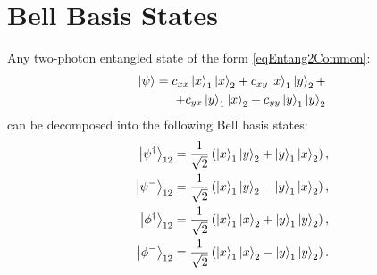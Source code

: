 \section{Bell Basis States}

Any two-photon entangled state of the form \eqref{eqEntang2Common}:
\begin{eqnarray}
\left|\psi\right> =  
c_{xx} \ket{x}_1\ket{x}_2 +
c_{xy} \ket{x}_1\ket{y}_2 +
\nonumber \\
+
c_{yx} \ket{y}_1\ket{x}_2 +
c_{yy} \ket{y}_1\ket{y}_2
\nonumber
\end{eqnarray}
can be decomposed into the following Bell basis states:
\begin{eqnarray}
  \left|\psi^{\dag}\right>_{12} = 
  \frac{1}{\sqrt{2}}\left(
  \ket{x}_1\ket{y}_2 + 
  \ket{y}_1\ket{x}_2
  \right),
  \nonumber \\
  \left|\psi^{-}\right>_{12} = 
  \frac{1}{\sqrt{2}}\left(
  \ket{x}_1\ket{y}_2 - 
  \ket{y}_1\ket{x}_2
  \right),
  \nonumber \\
  \left|\phi^{\dag}\right>_{12} = 
  \frac{1}{\sqrt{2}}\left(
  \ket{x}_1\ket{x}_2 + 
  \ket{y}_1\ket{y}_2
  \right),
  \nonumber \\
  \left|\phi^{-}\right>_{12} = 
  \frac{1}{\sqrt{2}}\left(
  \ket{x}_1\ket{x}_2 - 
  \ket{y}_1\ket{y}_2
  \right).
  \label{eqEntangBellBase}
\end{eqnarray}
 
